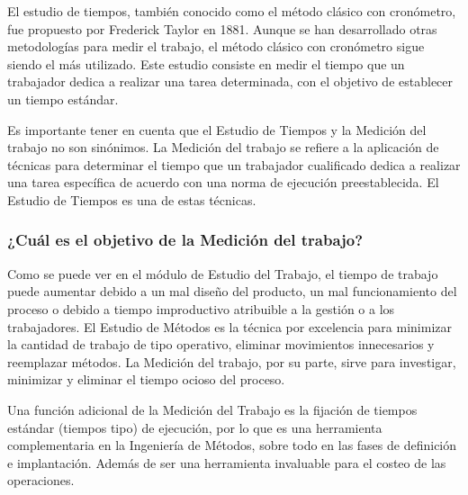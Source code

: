 \documentclass[../main]{subfiles}
\begin{document}
El estudio de tiempos, también conocido como el método clásico con
cronómetro, fue propuesto por Frederick Taylor en 1881. Aunque se han
desarrollado otras metodologías para medir el trabajo, el método
clásico con cronómetro sigue siendo el más utilizado. Este estudio
consiste en medir el tiempo que un trabajador dedica a realizar una
tarea determinada, con el objetivo de establecer un tiempo estándar.

Es importante tener en cuenta que el Estudio de Tiempos y la Medición
del trabajo no son sinónimos. La Medición del trabajo se refiere a la
aplicación de técnicas para determinar el tiempo que un trabajador
cualificado dedica a realizar una tarea específica de acuerdo con una
norma de ejecución preestablecida. El Estudio de Tiempos es una de
estas técnicas.


\subsubsection{¿Cuál es el objetivo de la Medición del trabajo?}

Como se puede ver en el módulo de Estudio del Trabajo, el tiempo de
trabajo puede aumentar debido a un mal diseño del producto, un mal
funcionamiento del proceso o debido a tiempo improductivo atribuible
a la gestión o a los trabajadores. El Estudio de Métodos es la
técnica por excelencia para minimizar la cantidad de trabajo de tipo
operativo, eliminar movimientos innecesarios y reemplazar métodos. La
Medición del trabajo, por su parte, sirve para investigar, minimizar
y eliminar el tiempo ocioso del proceso.

Una función adicional de la Medición del Trabajo es la fijación de
tiempos estándar (tiempos tipo) de ejecución, por lo que es una
herramienta complementaria en la Ingeniería de Métodos, sobre todo en
las fases de definición e implantación. Además de ser una herramienta
invaluable para el costeo de las operaciones.

\end{document}
